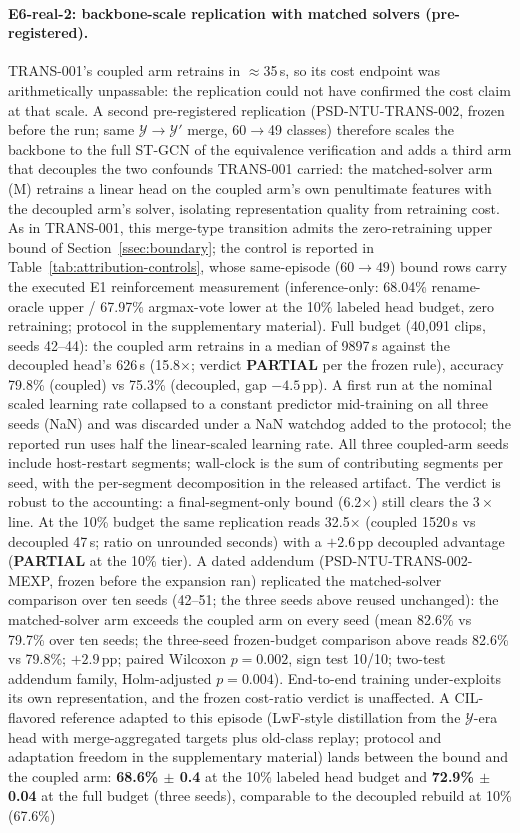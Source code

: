 \paragraph{E6-real-2: backbone-scale replication with matched solvers (pre-registered).}
TRANS-001's coupled arm retrains in $\approx$35\,s, so its cost endpoint was arithmetically unpassable: the replication could not have confirmed the cost claim at that scale. A second pre-registered replication (PSD-NTU-TRANS-002, frozen before the run; same $\mathcal{Y}\to\mathcal{Y}'$ merge, 60$\to$49 classes) therefore scales the backbone to the full ST-GCN of the equivalence verification and adds a third arm that decouples the two confounds TRANS-001 carried: the matched-solver arm (M) retrains a linear head on the coupled arm's own penultimate features with the decoupled arm's solver, isolating representation quality from retraining cost. As in TRANS-001, this merge-type transition admits the zero-retraining upper bound of Section~\ref{ssec:boundary}; the control is reported in Table~\ref{tab:attribution-controls}, whose same-episode ($60\to49$) bound rows carry the executed E1 reinforcement measurement (inference-only: 68.04\% rename-oracle upper / 67.97\% argmax-vote lower at the 10\% labeled head budget, zero retraining; protocol in the supplementary material). Full budget (40,091 clips, seeds 42--44): the coupled arm retrains in a median of 9897\,s against the decoupled head's 626\,s (15.8$\times$; verdict \textbf{PARTIAL} per the frozen rule), accuracy 79.8\% (coupled) vs 75.3\% (decoupled, gap $-4.5$\,pp). A first run at the nominal scaled learning rate collapsed to a constant predictor mid-training on all three seeds (NaN) and was discarded under a NaN watchdog added to the protocol; the reported run uses half the linear-scaled learning rate. All three coupled-arm seeds include host-restart segments; wall-clock is the sum of contributing segments per seed, with the per-segment decomposition in the released artifact. The verdict is robust to the accounting: a final-segment-only bound (6.2$\times$) still clears the $3\times$ line. At the 10\% budget the same replication reads 32.5$\times$ (coupled 1520\,s vs decoupled 47\,s; ratio on unrounded seconds) with a $+2.6$\,pp decoupled advantage (\textbf{PARTIAL} at the 10\% tier). A dated addendum (PSD-NTU-TRANS-002-MEXP, frozen before the expansion ran) replicated the matched-solver comparison over ten seeds (42--51; the three seeds above reused unchanged): the matched-solver arm exceeds the coupled arm on every seed (mean 82.6\% vs 79.7\% over ten seeds; the three-seed frozen-budget comparison above reads 82.6\% vs 79.8\%; $+2.9$\,pp; paired Wilcoxon $p=0.002$, sign test 10/10; two-test addendum family, Holm-adjusted $p=0.004$). End-to-end training under-exploits its own representation, and the frozen cost-ratio verdict is unaffected. A CIL-flavored reference adapted to this episode (LwF-style distillation from the $\mathcal{Y}$-era head with merge-aggregated targets plus old-class replay; protocol and adaptation freedom in the supplementary material) lands between the bound and the coupled arm: \textbf{68.6\% $\pm$ 0.4} at the 10\% labeled head budget and \textbf{72.9\% $\pm$ 0.04} at the full budget (three seeds), comparable to the decoupled rebuild at 10\% (67.6\%) 
